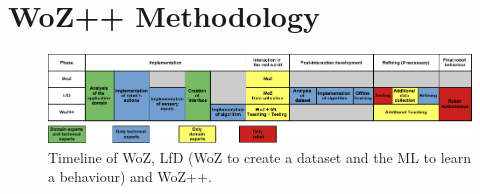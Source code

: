 \documentclass[manuscript, review, anonymous]{acmart}
\newcommand{\ES}[1]{\added[id=ES]{#1}}
\newcommand{\SL}[1]{\added[id=SL]{#1}}
\newcommand{\woz}{WoZ++\xspace}
\begin{document}
%		
%	
%	
%	

\section{\woz Methodology} \label{sec:method} 

\begin{figure}
    \centering
    \includegraphics[width=\textwidth]{figs/timeline.pdf}
    \caption{Timeline of WoZ, LfD (WoZ to create a dataset and the ML to learn a behaviour) and WoZ++. 
    }
    \label{fig:timeline}
\end{figure}
\end{document}
